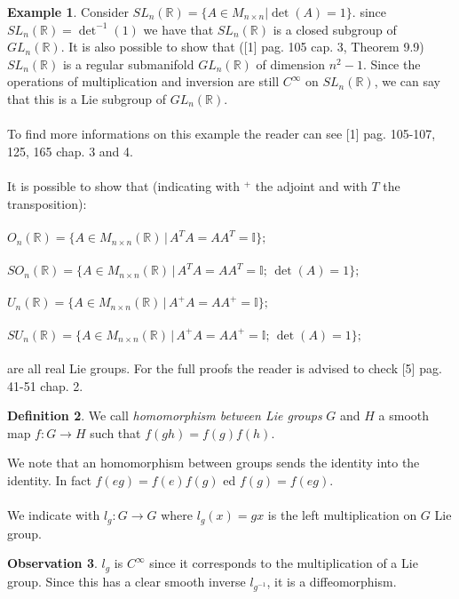 \documentclass[12pt,a4paper]{report}
\theoremstyle{definition}
\newtheorem{Def}{Definition}[chapter]
\theoremstyle{Theorem}
\theoremstyle{definition}
\newtheorem{Ex}[Def]{Example}
\theoremstyle{definition}
\newtheorem{Obs}[Def]{Observation}
\begin{document}
	\begin{Ex}
		Consider $SL_n(\mathbb{R})=\{A\in M_{n\times n}| \det(A)=1\}$. since $SL_n(\mathbb{R})=\det^{-1}(1)$ we have that $SL_n(\mathbb{R})$ is a closed subgroup of $GL_n(\mathbb{R})$. It is also possible to show that ([1] pag. 105 cap. 3, Theorem 9.9) $SL_n(\mathbb{R})$ is a regular submanifold $GL_n(\mathbb{R})$ of dimension $n^2-1$. Since the operations of multiplication and inversion are still $C^\infty$ on $SL_n(\mathbb{R})$, we can say that this is a Lie subgroup of $GL_n(\mathbb{R})$.\\
		\\
		To find more informations on this example the reader can see [1] pag. 105-107, 125, 165 chap. 3 and 4.\\
		\\
		It is possible to show that (indicating with $^+$ the adjoint and with $T$ the transposition):\\\\
		$O_n(\mathbb{R})=\{A\in M_{n\times n}(\mathbb{R})\, |\, A^TA=AA^T=\mathbb{I}\};$\\\\
		$SO_n(\mathbb{R})=\{A\in M_{n\times n}(\mathbb{R})\, |\, A^TA=AA^T=\mathbb{I};\, \det(A)=1\};$\\\\
		$U_n(\mathbb{R})=\{A\in M_{n\times n}(\mathbb{R})\, |\, A^+A=AA^+=\mathbb{I}\};$\\\\
		$SU_n(\mathbb{R})=\{A\in M_{n\times n}(\mathbb{R})\, |\, A^+A=AA^+=\mathbb{I};\,\det(A)=1\};$\\\\
		are all real Lie groups. 
		For the full proofs the reader is advised to check [5] pag. 41-51 chap. 2.
	\end{Ex}
	\begin{Def}
		We call \textit{homomorphism between Lie groups} $G$ and $H$ a smooth map $f:G\rightarrow H$ such that $f(gh)=f(g)f(h)$.
	\end{Def}
	We note that an homomorphism between groups sends the identity into the identity. In fact $f(eg)=f(e)f(g)$ ed $f(g)=f(eg)$.\\\\
	We indicate with $l_g:G\rightarrow G$ where $l_g(x)=gx$ is the left multiplication on $G$ Lie group.
	\begin{Obs}
		$l_g$ is $C^\infty$ since it corresponds to the multiplication of a Lie group. Since this has a clear smooth inverse $l_{g^{-1}}$, it is a diffeomorphism.
	\end{Obs}
\end{document}
